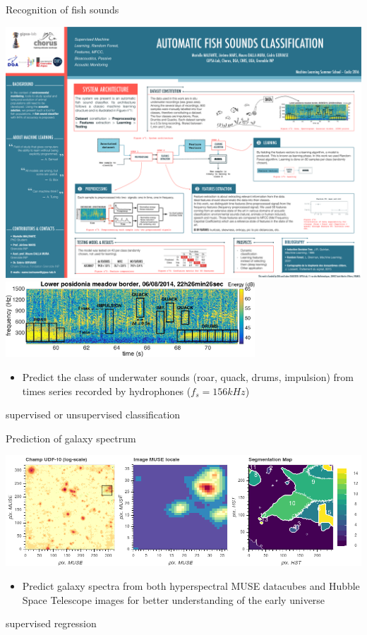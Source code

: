 \documentclass[pressentation,9pt,aspectratio=1610,xcolor=table]{beamer}
\newcommand{\doigt}{\noindent \Pisymbol{pzd}{43}}
\begin{document}
\begin{frame}{Recognition of fish sounds}

  \begin{center}
    \includegraphics[keepaspectratio=true,width=.3\textwidth]{get_data.pdf}
    \includegraphics[keepaspectratio=true,width=0.7\textwidth]{spectro_global_top_16384-small.jpg}
  \end{center}
  \begin{itemize}
  \item[\doigt] Predict the class of underwater sounds (roar, quack, drums, impulsion) from  times series recorded by hydrophones ($f_s=156kHz$)
  \end{itemize}

  \begin{center}
    \alert{supervised or unsupervised classification}
  \end{center}
  
\end{frame}

\begin{frame}{Prediction of galaxy spectrum}

  \begin{center}
    \includegraphics[width=.8\textwidth]{screenshot-whiteimages.png} \\
  \end{center}
  \begin{itemize}
  \item[\doigt] Predict galaxy spectra from both hyperspectral MUSE datacubes and Hubble Space Telescope images for better understanding of the early universe
  \end{itemize}
  \begin{center}
    \alert{supervised regression}
  \end{center}
\end{frame}
\end{document}
